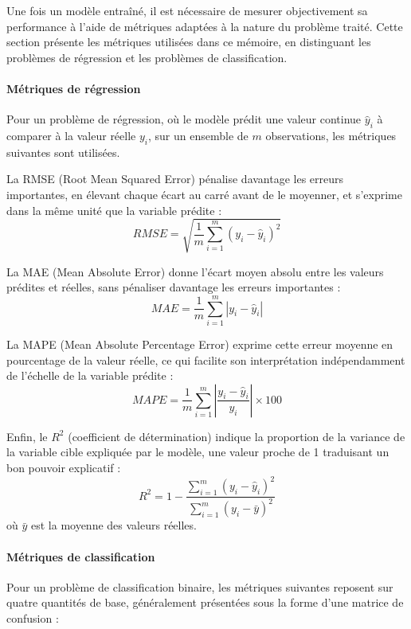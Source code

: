 \documentclass[a4paper,12pt, oneside]{article}
\begin{document}
Une fois un modèle entraîné, il est nécessaire de mesurer objectivement sa performance à l'aide de métriques adaptées à la nature du problème traité. Cette section présente les métriques utilisées dans ce mémoire, en distinguant les problèmes de régression et les problèmes de classification.

\paragraph{Métriques de régression\\}
Pour un problème de régression, où le modèle prédit une valeur continue $\hat{y}_i$ à comparer à la valeur réelle $y_i$, sur un ensemble de $m$ observations, les métriques suivantes sont utilisées.

La RMSE (Root Mean Squared Error) pénalise davantage les erreurs importantes, en élevant chaque écart au carré avant de le moyenner, et s'exprime dans la même unité que la variable prédite :
\[
RMSE = \sqrt{\frac{1}{m}\sum_{i=1}^{m}\left(y_i - \hat{y}_i\right)^2}
\]

La MAE (Mean Absolute Error) donne l'écart moyen absolu entre les valeurs prédites et réelles, sans pénaliser davantage les erreurs importantes :
\[
MAE = \frac{1}{m}\sum_{i=1}^{m}\left|y_i - \hat{y}_i\right|
\]

La MAPE (Mean Absolute Percentage Error) exprime cette erreur moyenne en pourcentage de la valeur réelle, ce qui facilite son interprétation indépendamment de l'échelle de la variable prédite :
\[
MAPE = \frac{1}{m}\sum_{i=1}^{m}\left|\frac{y_i - \hat{y}_i}{y_i}\right| \times 100
\]

Enfin, le $R^2$ (coefficient de détermination) indique la proportion de la variance de la variable cible expliquée par le modèle, une valeur proche de 1 traduisant un bon pouvoir explicatif :
\[
R^2 = 1 - \frac{\sum_{i=1}^{m}\left(y_i - \hat{y}_i\right)^2}{\sum_{i=1}^{m}\left(y_i - \bar{y}\right)^2}
\]
où $\bar{y}$ est la moyenne des valeurs réelles.

\paragraph{Métriques de classification\\}
Pour un problème de classification binaire, les métriques suivantes reposent sur quatre quantités de base, généralement présentées sous la forme d'une matrice de confusion :
\end{document}
